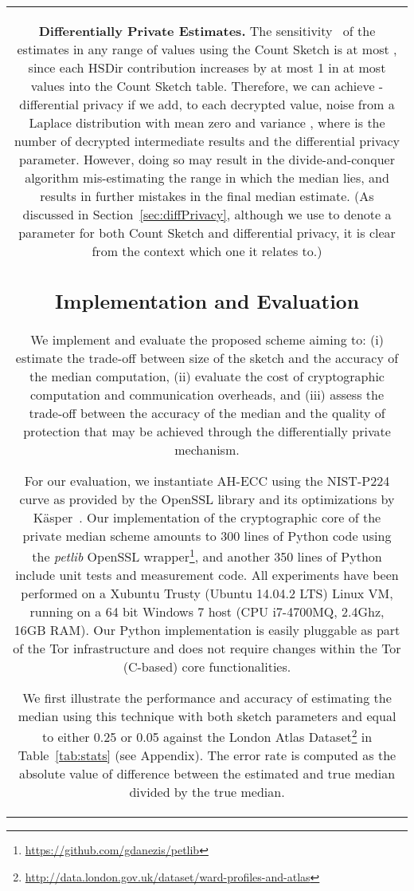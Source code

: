 \documentclass[conference]{IEEEtran}
\newcommand{\descr}[1]{\medskip \noindent \textbf{#1}}
\begin{document}
\begin{figure*}[ht!]
{\begin{tabular}{|c|}
\descr{Differentially Private Estimates.} The sensitivity~\cite{dwork2006calibrating} of the estimates in any range of values using the Count Sketch is at most , since each HSDir contribution increases by at most 1 in at most  values into the  Count Sketch table. Therefore, we can achieve -differential privacy if we add, to each decrypted value, noise from a Laplace distribution with mean zero and variance , where  is the number of decrypted intermediate results and  the differential privacy parameter. However, doing so may result in the divide-and-conquer algorithm mis-estimating the range in which the median lies, and results in further mistakes in the final median estimate. (As discussed in Section~\ref{sec:diffPrivacy}, although we use 
to denote a parameter for both Count Sketch and differential privacy, it is clear from the context which one it relates to.)

\subsection{Implementation and Evaluation}

We implement and evaluate the proposed scheme aiming to: (i) estimate the trade-off between size of the sketch and the accuracy of the median computation, (ii) evaluate the cost of cryptographic computation and communication overheads, and (iii) assess the trade-off between the accuracy of the median and the quality of protection that may be achieved through the differentially private mechanism.

For our evaluation, we instantiate AH-ECC using the NIST-P224 curve as provided by the OpenSSL library and its optimizations by K{\"a}sper~\cite{kasper2012fast}. Our implementation of the cryptographic core of the private median scheme amounts to 300 lines of Python code using the \emph{petlib} OpenSSL wrapper\footnote{\url{https://github.com/gdanezis/petlib}}, and another 350 lines of Python include unit tests and measurement code. All experiments have been performed on a Xubuntu Trusty (Ubuntu 14.04.2 LTS) Linux VM, running on a 64 bit Windows 7 host (CPU i7-4700MQ, 2.4Ghz, 16GB RAM).
Our Python implementation is easily pluggable as part of the Tor infrastructure and does not require changes within the Tor (C-based) core functionalities.

We first illustrate the performance and accuracy of estimating the median using this technique with both sketch parameters  and  equal to either 0.25 or 0.05 against the London Atlas Dataset\footnote{\url{http://data.london.gov.uk/dataset/ward-profiles-and-atlas}} in Table~\ref{tab:stats} (see Appendix). The error rate is computed as the absolute value of difference between the estimated and true median divided by the true median.


\end{tabular}}
\end{figure*}
\end{document}
